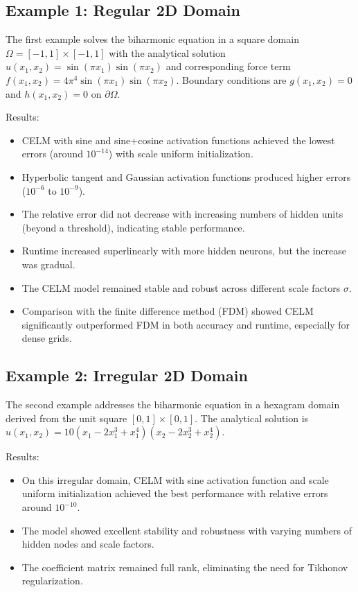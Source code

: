 \documentclass[11pt]{article}
\begin{document}
\subsection{Example 1: Regular 2D Domain}

The first example solves the biharmonic equation in a square domain $\Omega = [-1, 1] \times [-1, 1]$ with the analytical solution $u(x_1, x_2) = \sin(\pi x_1)\sin(\pi x_2)$ and corresponding force term $f(x_1, x_2) = 4\pi^4 \sin(\pi x_1)\sin(\pi x_2)$. Boundary conditions are $g(x_1, x_2) = 0$ and $h(x_1, x_2) = 0$ on $\partial\Omega$.

Results:
\begin{itemize}
    \item CELM with sine and sine+cosine activation functions achieved the lowest errors (around $10^{-14}$) with scale uniform initialization.
    \item Hyperbolic tangent and Gaussian activation functions produced higher errors ($10^{-6}$ to $10^{-9}$).
    \item The relative error did not decrease with increasing numbers of hidden units (beyond a threshold), indicating stable performance.
    \item Runtime increased superlinearly with more hidden neurons, but the increase was gradual.
    \item The CELM model remained stable and robust across different scale factors $\sigma$.
    \item Comparison with the finite difference method (FDM) showed CELM significantly outperformed FDM in both accuracy and runtime, especially for dense grids.
\end{itemize}

\subsection{Example 2: Irregular 2D Domain}

The second example addresses the biharmonic equation in a hexagram domain derived from the unit square $[0,1] \times [0,1]$. The analytical solution is $u(x_1, x_2) = 10(x_1 - 2x_1^3 + x_1^4)(x_2 - 2x_2^3 + x_2^4)$.

Results:
\begin{itemize}
    \item On this irregular domain, CELM with sine activation function and scale uniform initialization achieved the best performance with relative errors around $10^{-10}$.
    \item The model showed excellent stability and robustness with varying numbers of hidden nodes and scale factors.
    \item The coefficient matrix remained full rank, eliminating the need for Tikhonov regularization.
\end{itemize}
\end{document}
